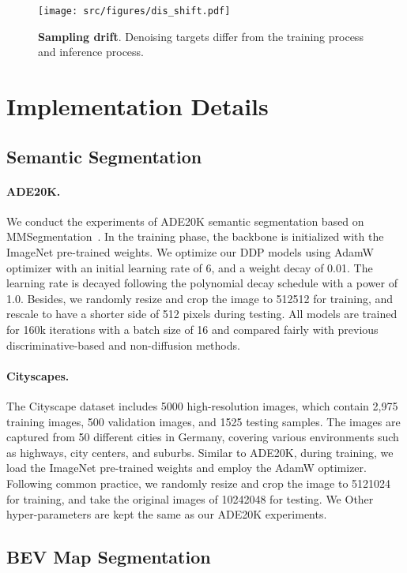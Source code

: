 \documentclass[10pt,twocolumn,letterpaper]{article}
\newcommand{\ours}[0]{DDP\xspace}
\begin{document}
\begin{figure}[t!]
    \centering
    \texttt{[image: src/figures/dis\_shift.pdf]}
    \caption{\textbf{Sampling drift}. Denoising targets differ from the training process and inference process. }
    \label{fig:dis:shift}
\end{figure}

\section{Implementation Details}
\label{supp:implement}
\subsection{Semantic Segmentation}
\paragraph{ADE20K.} We conduct the experiments of ADE20K \cite{zhou2017scene} semantic segmentation based on MMSegmentation~\cite{mmseg2020}.
In the training phase, the backbone is initialized with the ImageNet \cite{deng2009imagenet} pre-trained weights.
We optimize our \ours models using AdamW~\cite{loshchilov2017decoupled} optimizer with an initial learning rate of 6, and a weight decay of 0.01.
The learning rate is decayed following the polynomial decay schedule with a power of 1.0.
Besides, we randomly resize and crop the image to 512512 for training, and rescale to have a shorter side of 512 pixels during testing.
All models are trained for 160k iterations with a batch size of 16 and compared fairly with previous discriminative-based and non-diffusion methods.


\paragraph{Cityscapes.}
The Cityscape dataset includes 5000 high-resolution images, which contain  2,975 training images, 500 validation images, and 1525 testing samples.
The images are captured from 50 different cities in Germany, covering various environments such as highways, city centers, and suburbs.
Similar to ADE20K, during training, we load the ImageNet pre-trained weights and employ the AdamW optimizer.
Following common practice, we randomly resize and crop the image to 5121024 for training, and take the original images of 10242048 for testing.
We 
Other hyper-parameters are kept the same as our ADE20K experiments.

\subsection{BEV Map Segmentation}
\end{document}
